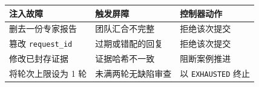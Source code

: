 \begin{tabular}{@{}P{3.0cm}P{4.6cm}P{4.9cm}@{}}
\toprule
\textbf{注入故障} & \textbf{触发屏障} & \textbf{控制器动作} \\
\midrule
删去一份专家报告 & 团队汇合不完整 & 拒绝该次提交 \\
篡改 \texttt{request\_id} & 过期或错配的回复 & 拒绝该次提交 \\
修改已封存证据 & 证据哈希不一致 & 阻断案例推进 \\
将轮次上限设为 1 轮 & 未满两轮无缺陷审查 & 以 \texttt{EXHAUSTED} 终止 \\
\bottomrule
\end{tabular}
